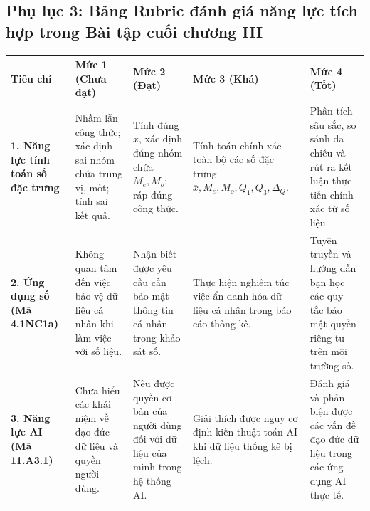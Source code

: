 \documentclass[12pt, a4paper]{article}
\begin{document}
\subsection*{Phụ lục 3: Bảng Rubric đánh giá năng lực tích hợp trong Bài tập cuối chương III}

\begin{center}
\begin{tabularx}{\linewidth}{|p{3.2cm}|X|X|X|X|}
\hline
\textbf{Tiêu chí} & \textbf{Mức 1 (Chưa đạt)} & \textbf{Mức 2 (Đạt)} & \textbf{Mức 3 (Khá)} & \textbf{Mức 4 (Tốt)} \\
\hline
\textbf{1. Năng lực tính toán số đặc trưng} & Nhầm lẫn công thức; xác định sai nhóm chứa trung vị, mốt; tính sai kết quả. & Tính đúng $\overline{x}$, xác định đúng nhóm chứa $M_e, M_o$; ráp đúng công thức. & Tính toán chính xác toàn bộ các số đặc trưng $\overline{x}, M_e, M_o, Q_1, Q_3, \Delta_Q$. & Phân tích sâu sắc, so sánh đa chiều và rút ra kết luận thực tiễn chính xác từ số liệu. \\
\hline
\textbf{2. Ứng dụng số (Mã 4.1NC1a)} & Không quan tâm đến việc bảo vệ dữ liệu cá nhân khi làm việc với số liệu. & Nhận biết được yêu cầu cần bảo mật thông tin cá nhân trong khảo sát số. & Thực hiện nghiêm túc việc ẩn danh hóa dữ liệu cá nhân trong báo cáo thống kê. & Tuyên truyền và hướng dẫn bạn học các quy tắc bảo mật quyền riêng tư trên môi trường số. \\
\hline
\textbf{3. Năng lực AI (Mã 11.A3.1)} & Chưa hiểu các khái niệm về đạo đức dữ liệu và quyền người dùng. & Nêu được quyền cơ bản của người dùng đối với dữ liệu của mình trong hệ thống AI. & Giải thích được nguy cơ định kiến thuật toán AI khi dữ liệu thống kê bị lệch. & Đánh giá và phản biện được các vấn đề đạo đức dữ liệu trong các ứng dụng AI thực tế. \\
\hline
\end{tabularx}
\end{center}
\end{document}
